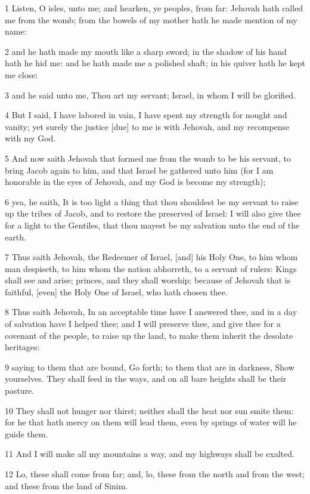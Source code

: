 \par 1 Listen, O isles, unto me; and hearken, ye peoples, from far: Jehovah hath called me from the womb; from the bowels of my mother hath he made mention of my name:
\par 2 and he hath made my mouth like a sharp sword; in the shadow of his hand hath he hid me: and he hath made me a polished shaft; in his quiver hath he kept me close:
\par 3 and he said unto me, Thou art my servant; Israel, in whom I will be glorified.
\par 4 But I said, I have labored in vain, I have spent my strength for nought and vanity; yet surely the justice [due] to me is with Jehovah, and my recompense with my God.
\par 5 And now saith Jehovah that formed me from the womb to be his servant, to bring Jacob again to him, and that Israel be gathered unto him (for I am honorable in the eyes of Jehovah, and my God is become my strength);
\par 6 yea, he saith, It is too light a thing that thou shouldest be my servant to raise up the tribes of Jacob, and to restore the preserved of Israel: I will also give thee for a light to the Gentiles, that thou mayest be my salvation unto the end of the earth.
\par 7 Thus saith Jehovah, the Redeemer of Israel, [and] his Holy One, to him whom man despiseth, to him whom the nation abhorreth, to a servant of rulers: Kings shall see and arise; princes, and they shall worship; because of Jehovah that is faithful, [even] the Holy One of Israel, who hath chosen thee.
\par 8 Thus saith Jehovah, In an acceptable time have I answered thee, and in a day of salvation have I helped thee; and I will preserve thee, and give thee for a covenant of the people, to raise up the land, to make them inherit the desolate heritages:
\par 9 saying to them that are bound, Go forth; to them that are in darkness, Show yourselves. They shall feed in the ways, and on all bare heights shall be their pasture.
\par 10 They shall not hunger nor thirst; neither shall the heat nor sun smite them: for he that hath mercy on them will lead them, even by springs of water will he guide them.
\par 11 And I will make all my mountains a way, and my highways shall be exalted.
\par 12 Lo, these shall come from far; and, lo, these from the north and from the west; and these from the land of Sinim.

